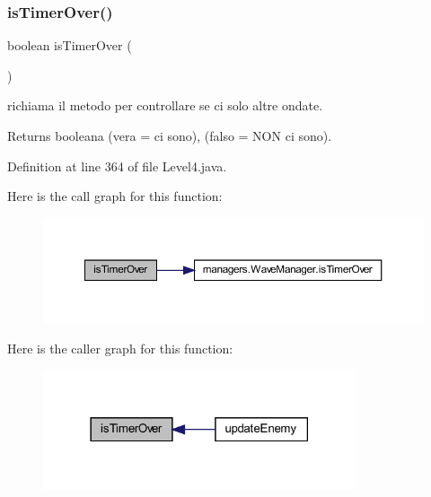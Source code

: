 \subsubsection{\texorpdfstring{is\+Timer\+Over()}{isTimerOver()}}
{\footnotesize\ttfamily boolean is\+Timer\+Over (\begin{DoxyParamCaption}{ }\end{DoxyParamCaption})\hspace{0.3cm}{\ttfamily [private]}}



richiama il metodo per controllare se ci solo altre ondate. 

\begin{DoxyReturn}{Returns}
booleana (vera = ci sono), (falso = N\+ON ci sono). 
\end{DoxyReturn}


Definition at line 364 of file Level4.\+java.

Here is the call graph for this function\+:\nopagebreak
\begin{figure}[H]
\begin{center}
\leavevmode
\includegraphics[width=350pt]{classscenes_1_1_level4_ab68417e6738c05037923f5f0f21eb586_cgraph}
\end{center}
\end{figure}
Here is the caller graph for this function\+:\nopagebreak
\begin{figure}[H]
\begin{center}
\leavevmode
\includegraphics[width=261pt]{classscenes_1_1_level4_ab68417e6738c05037923f5f0f21eb586_icgraph}
\end{center}
\end{figure}
\mbox{\label{classscenes_1_1_level4_aa12eb1084be2c4d9b03d5f248f00900d}} 
